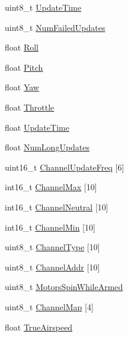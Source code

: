 \begin{DoxyCompactItemize}
\item 
uint8\-\_\-t \hyperlink{struct____attribute_____ac93c8162cd35ab48bda14023b4505cfe}{\-Update\-Time}
\item 
uint8\-\_\-t \hyperlink{struct____attribute_____a15b4aa3fdb1c15c0842d77e8efff2f8d}{\-Num\-Failed\-Updates}
\item 
float \hyperlink{struct____attribute_____aa999b9efb942396aa2db4c9d604ecbac}{\-Roll}
\item 
float \hyperlink{struct____attribute_____a8e0fe5f79dc339367a527d78c8ce85bc}{\-Pitch}
\item 
float \hyperlink{struct____attribute_____ad6cda9d8bdf2a88c79d62ef012c4447e}{\-Yaw}
\item 
float \hyperlink{struct____attribute_____a67f3a5b4ec90aa0d4dfb36cb9a3a2593}{\-Throttle}
\item 
float \hyperlink{struct____attribute_____af84ecd51fe6dbc0d88d848da3d039a98}{\-Update\-Time}
\item 
float \hyperlink{struct____attribute_____a6b5a3b7424676ea01c606d47ce6d9225}{\-Num\-Long\-Updates}
\item 
uint16\-\_\-t \hyperlink{struct____attribute_____af87e63d51524ec0e92ea666f56a34653}{\-Channel\-Update\-Freq} \mbox{[}6\mbox{]}
\item 
int16\-\_\-t \hyperlink{struct____attribute_____aeb09cf04435444e23c55bbf1f6ffe7f2}{\-Channel\-Max} \mbox{[}10\mbox{]}
\item 
int16\-\_\-t \hyperlink{struct____attribute_____aa0e0faaaf5edfd2915dd746d5493898e}{\-Channel\-Neutral} \mbox{[}10\mbox{]}
\item 
int16\-\_\-t \hyperlink{struct____attribute_____a273839942ffbb6ddeed9dae3576debed}{\-Channel\-Min} \mbox{[}10\mbox{]}
\item 
uint8\-\_\-t \hyperlink{struct____attribute_____a77b8f28a2387672c8ca97c5aef20c62a}{\-Channel\-Type} \mbox{[}10\mbox{]}
\item 
uint8\-\_\-t \hyperlink{struct____attribute_____a8edfa0abebe61725ea8c7f241a7c93d2}{\-Channel\-Addr} \mbox{[}10\mbox{]}
\item 
uint8\-\_\-t \hyperlink{struct____attribute_____abc11f4bd9c9e00376dba7207b3355ce0}{\-Motors\-Spin\-While\-Armed}
\item 
uint8\-\_\-t \hyperlink{struct____attribute_____afe1e54771a83e7d240837b50a540a35e}{\-Channel\-Map} \mbox{[}4\mbox{]}
\item 
float \hyperlink{struct____attribute_____a451e2ea5b7d09b29c20075f5579bd032}{\-True\-Airspeed}
\item 

\end{DoxyCompactItemize}
